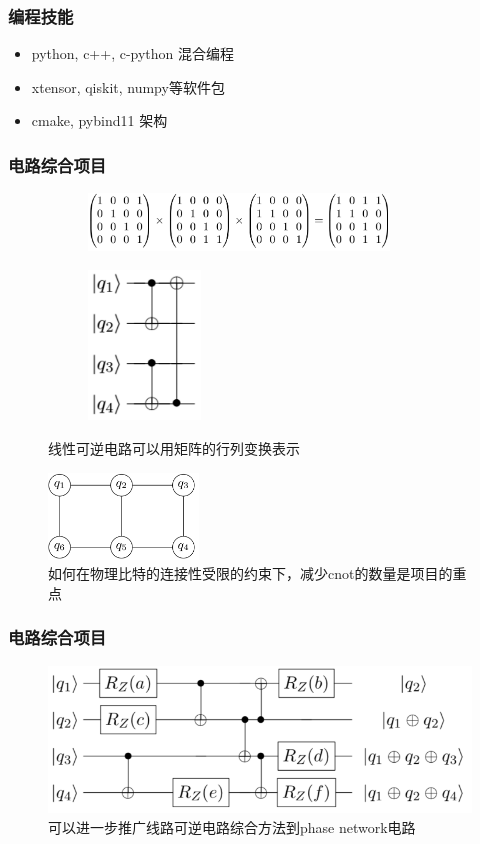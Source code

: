 \documentclass[aspectratio=1610]{beamer}
\begin{document}
\begin{frame}
\frametitle{编程技能}
\begin{itemize}
    \setlength{\itemsep}{20pt}
    \item python, c++, c-python 混合编程
    \item xtensor, qiskit, numpy等软件包
    \item cmake, pybind11 架构
\end{itemize}
\end{frame}

\begin{frame}
    \frametitle{电路综合项目}
    \begin{figure}[ht]
        \centering
        \begin{subfigure}{0.4\textwidth}
            \centering
            \includegraphics[width=8cm]{cnot.png}
        \end{subfigure}
        \hfill
        \begin{subfigure}{0.4\textwidth}
            \centering
            \includegraphics[width=3cm]{cnot_circuit.png}
        \end{subfigure}
        \caption{线性可逆电路可以用矩阵的行列变换表示}
    \end{figure}
    \begin{figure}
        \centering
        \includegraphics[width=4cm]{graph.png}
        \caption{如何在物理比特的连接性受限的约束下，减少cnot的数量是项目的重点}
    \end{figure}    
\end{frame}
\begin{frame}
    \frametitle{电路综合项目}
    \begin{figure}[htbp]
        \includegraphics[width=.8\textwidth]{phase.png}
        \caption{可以进一步推广线路可逆电路综合方法到phase network电路}
    \end{figure}
\end{frame}
\end{document}
